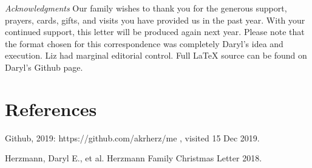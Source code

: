 \documentclass[letterpaper,11pt]{article}
\def\refer{\par\noindent\hangindent\parindent\hangafter1}
\begin{document}
\begin{multicols}{2}
\bigskip
  \emph{Acknowledgments} Our family wishes to thank you for the generous 
support, prayers, cards, gifts, and visits you have provided us in the past
year. With your continued support, this letter will be produced again
next year. Please note that the format chosen for this
correspondence was completely Daryl's idea and execution. Liz had marginal
editorial control. Full \LaTeX\xspace source can be found on Daryl's Github
page.

\section{References}

\refer Github, 2019: https://github.com/akrherz/me , visited 15 Dec 2019.
\refer Herzmann, Daryl E., et al. Herzmann Family Christmas Letter 2018.

\end{multicols}
\end{document}
